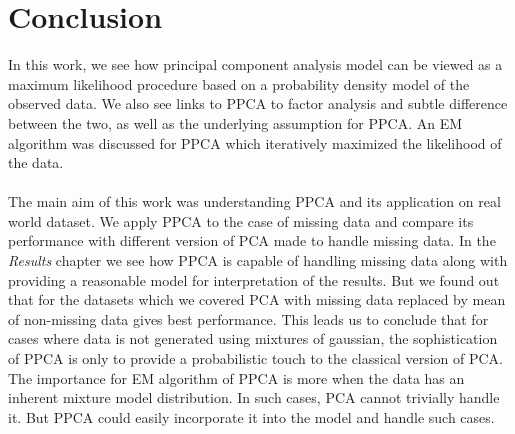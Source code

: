 \chapter{Conclusion}
In this work, we see how principal component analysis model can be viewed as a maximum likelihood procedure based on a probability density model of the observed data. We also see links to PPCA to factor analysis and subtle difference between the two, as well as the underlying assumption for PPCA. An EM algorithm was discussed for PPCA which iteratively maximized the likelihood of the data.\\\\
The main aim of this work was understanding PPCA and its application on real world dataset. We apply PPCA to the case of missing data and compare its performance with different version of PCA made to handle missing data. In the \emph{Results} chapter we see how PPCA is capable of handling missing data along with providing a reasonable model for interpretation of the results. But we found out that for the datasets which we covered PCA with missing data replaced by mean of non-missing data gives best performance. This leads us to conclude that for cases where data is not generated using mixtures of gaussian, the sophistication of PPCA is only to provide a probabilistic touch to the classical version of PCA.\\
The importance for EM algorithm of PPCA is more when the data has an inherent mixture model distribution. In such cases, PCA cannot trivially handle it. But PPCA could easily incorporate it into the model and handle such cases.